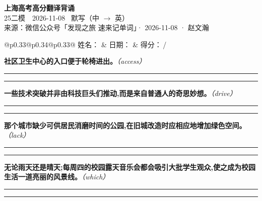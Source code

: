 \documentclass[11pt,a4paper]{article}
\newcommand{\num}[1]{\makebox[1.9em][r]{#1.}\hspace{0.3em}}
\newcommand{\wline}{\noindent\rule{\linewidth}{0.4pt}}
\newcommand{\prompt}[1]{\emph{\textcolor{tipblue}{\small（#1）}}}
\begin{document}
\pagestyle{plain}
\begin{center}
{\LARGE\bfseries 上海高考高分翻译背诵 }\\[0.25em]
{\large 25二模　2026-11-08 \quad\ 默写（中 $\to$ 英）}\\[0.35em]
{\footnotesize 来源：微信公众号「发现之旅 速来记单词」· 2026-11-08 · 赵文瀚}
\end{center}

\vspace{0.4em}
\noindent\begin{tabular}{@{}p{0.33\textwidth}@{}p{0.34\textwidth}@{}p{0.33\textwidth}@{}}
姓名：\underline{\hspace{2.0cm}} & 日期：\underline{\hspace{2.0cm}} & 得分：\underline{\hspace{1.4cm}}\,/ \\
\end{tabular}

\vspace{0.5em}

\vspace{0.8em}
\num{1}\textbf{社区卫生中心的入口便于轮椅进出。}\prompt{access}

\vspace{0.3em}

\wline\vspace{0.3em}
\wline

\num{2}\textbf{一些技术突破并非由科技巨头们推动,而是来自普通人的奇思妙想。}\prompt{drive}

\vspace{0.3em}

\wline\vspace{0.3em}
\wline

\num{3}\textbf{那个城市缺少可供居民消磨时间的公园,在旧城改造时应相应地增加绿色空间。}\prompt{lack}

\vspace{0.3em}

\wline\vspace{0.3em}
\wline

\num{4}\textbf{无论雨天还是晴天;每周四的校园露天音乐会都会吸引大批学生观众,使之成为校园生活一道亮丽的风景线。}\prompt{which}

\vspace{0.3em}

\wline\vspace{0.3em}
\wline
\end{document}
